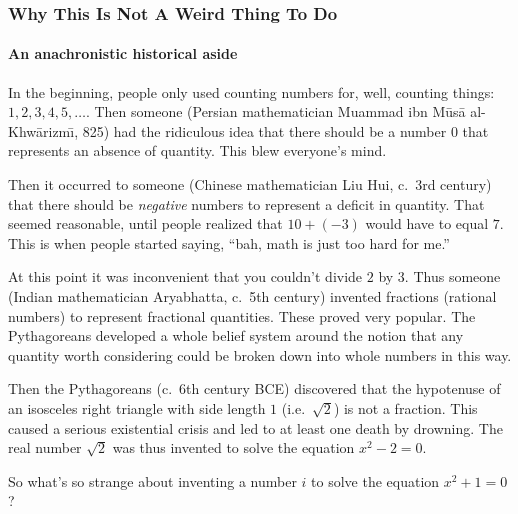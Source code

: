 \begin{frame}
\frametitle{Why This Is Not A Weird Thing To Do}
\framesubtitle{An anachronistic historical aside}

\small
In the beginning, people only used counting numbers for, well, counting things:
$1,2,3,4,5,\ldots$.
\pause
Then someone (Persian mathematician Muammad ibn M\=us\=a
al-Khw\=arizm\=\i, 825) had the ridiculous idea that there should be a number
$0$ that represents an absence of quantity.
\pause
This blew everyone's mind.

\pause\medskip
Then it occurred to someone (Chinese mathematician Liu Hui, c.\ 3rd century)
that there should be \emph{negative} numbers to represent a deficit in quantity.
\pause
That seemed reasonable, until people realized that $10 + (-3)$ would have to
equal $7$.
\pause
This is when people started saying, ``bah, math is just too hard for me.''

\pause\medskip
At this point it was inconvenient that you couldn't divide $2$ by $3$.
\pause
Thus someone (Indian mathematician Aryabhatta, c.\ 5th century) invented
fractions (rational numbers) to represent fractional quantities.
\pause
These proved very popular.  The Pythagoreans developed a whole belief system
around the notion that any quantity worth considering could be broken down into
whole numbers in this way.

\pause\medskip
Then the Pythagoreans (c.\ 6th century BCE) discovered that the hypotenuse of an
isosceles right triangle with side length $1$ (i.e.\ $\sqrt 2$) is not a
fraction.
\pause
This caused a serious existential crisis and led to at least one death by
drowning.
\pause
The real number $\sqrt 2$ was thus invented to solve the equation $x^2-2=0$.

\pause\medskip
So what's so strange about inventing a number $i$ to solve the equation $x^2+1=0$?

\end{frame}



